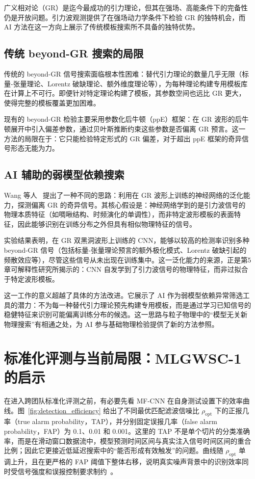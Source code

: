 广义相对论（GR）是迄今最成功的引力理论，但其在强场、高能条件下的完备性仍是开放问题。引力波观测提供了在强场动力学条件下检验 GR 的独特机会，而 AI 方法在这一方向上展示了传统模板搜索所不具备的独特优势。

\subsection{传统 beyond-GR 搜索的局限}

传统的 beyond-GR 信号搜索面临根本性困难：替代引力理论的数量几乎无限（标量-张量理论、Lorentz 破缺理论、额外维度理论等），为每种理论构建专用模板库在计算上不可行。即便针对特定理论构建了模板，其参数空间也远比 GR 更大，使得完整的模板覆盖更加困难。

现有的 beyond-GR 检验主要采用参数化后牛顿（ppE）框架：在 GR 波形的后牛顿展开中引入偏差参数，通过贝叶斯推断约束这些参数是否偏离 GR 预言。这一方法的局限在于：它只能检验特定形式的 GR 偏差，对于超出 ppE 框架的奇异信号形态无能为力。

\subsection{AI 辅助的弱模型依赖搜索}

Wang 等人~\cite{wang2025beyondgr} 提出了一种不同的思路：利用在 GR 波形上训练的神经网络的泛化能力，探测偏离 GR 的奇异信号。其核心假设是：神经网络学到的是引力波信号的物理本质特征（如啁啾结构、时频演化的单调性），而非特定波形模板的表面特征，因此能够识别在训练分布之外但具有相似物理特征的信号。

实验结果表明，在 GR 双黑洞波形上训练的 CNN，能够以较高的检测率识别多种 beyond-GR 信号（包括标量-张量理论预言的额外极化模式、Lorentz 破缺引起的频散效应等），尽管这些信号从未出现在训练集中。这一泛化能力的来源，正是第5章可解释性研究所揭示的：CNN 自发学到了引力波信号的物理特征，而非过拟合于特定波形模板。

这一工作的意义超越了具体的方法改进。它展示了 AI 作为弱模型依赖异常筛选工具的潜力：不为每一种替代引力理论预先构建专用模板，而是通过学习已知信号的稳健特征来识别可能偏离训练分布的候选。这一思路与粒子物理中的“模型无关新物理搜索”有相通之处，为 AI 参与基础物理检验提供了新的方法参照。

\section{标准化评测与当前局限：MLGWSC-1的启示}

在进入跨团队标准化评测之前，有必要先看 MF-CNN 在自身测试设置下的效率曲线。图~\ref{fig:detection_efficiency} 给出了不同最优匹配滤波信噪比 $\rho_\mathrm{opt}$ 下的正报几率（true alarm probability，TAP），并分别固定误报几率（false alarm probability，FAP）为 0.1、0.01 和 0.001。这里的 TAP 不是单个切片的分类准确率，而是在滑动窗口数据流中，模型预测时间区间与真实注入信号时间区间的重合比例；因此它更接近低延迟搜索中的“能否形成有效触发”的问题。曲线随 $\rho_\mathrm{opt}$ 单调上升，且在更严格的 FAP 阈值下整体右移，说明真实噪声背景中的识别效率同时受信号强度和误报控制要求制约~\cite{wang2020deeplearning,IphysResearchGWDLC6}。

